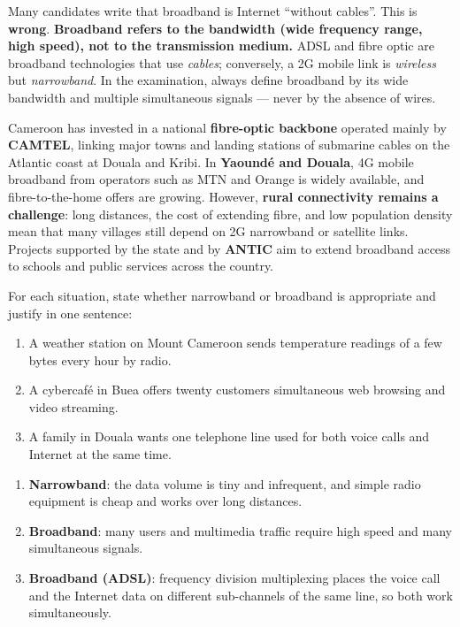 \documentclass[11pt]{article}
\begin{document}
\begin{attention}
Many candidates write that broadband is Internet ``without cables''. This is \textbf{wrong}. \textbf{Broadband refers to the bandwidth (wide frequency range, high speed), not to the transmission medium.} ADSL and fibre optic are broadband technologies that use \emph{cables}; conversely, a 2G mobile link is \emph{wireless} but \emph{narrowband}. In the examination, always define broadband by its wide bandwidth and multiple simultaneous signals --- never by the absence of wires.
\end{attention}

\begin{savaistu}
Cameroon has invested in a national \textbf{fibre-optic backbone} operated mainly by \textbf{CAMTEL}, linking major towns and landing stations of submarine cables on the Atlantic coast at Douala and Kribi. In \textbf{Yaoundé and Douala}, 4G mobile broadband from operators such as MTN and Orange is widely available, and fibre-to-the-home offers are growing. However, \textbf{rural connectivity remains a challenge}: long distances, the cost of extending fibre, and low population density mean that many villages still depend on 2G narrowband or satellite links. Projects supported by the state and by \textbf{ANTIC} aim to extend broadband access to schools and public services across the country.
\end{savaistu}

\begin{exercice}
For each situation, state whether narrowband or broadband is appropriate and justify in one sentence:
\begin{enumerate}
\item A weather station on Mount Cameroon sends temperature readings of a few bytes every hour by radio.
\item A cybercafé in Buea offers twenty customers simultaneous web browsing and video streaming.
\item A family in Douala wants one telephone line used for both voice calls and Internet at the same time.
\end{enumerate}
\end{exercice}

\begin{corrige}[Exercise 1]
\begin{enumerate}
\item \textbf{Narrowband}: the data volume is tiny and infrequent, and simple radio equipment is cheap and works over long distances.
\item \textbf{Broadband}: many users and multimedia traffic require high speed and many simultaneous signals.
\item \textbf{Broadband (ADSL)}: frequency division multiplexing places the voice call and the Internet data on different sub-channels of the same line, so both work simultaneously.
\end{enumerate}
\end{corrige}
\end{document}
